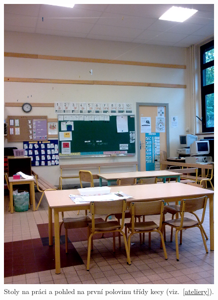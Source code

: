 	\begin{figure}[tb]
		\centering
		\includegraphics[height=0.35\textheight]{./fotky/Obr14.jpg}
		\caption{
			Stoly na práci a pohled na první polovinu třídy kecy (viz.~\ref{ateliery}).
		}
		\label{Obr14}
	\end{figure}

